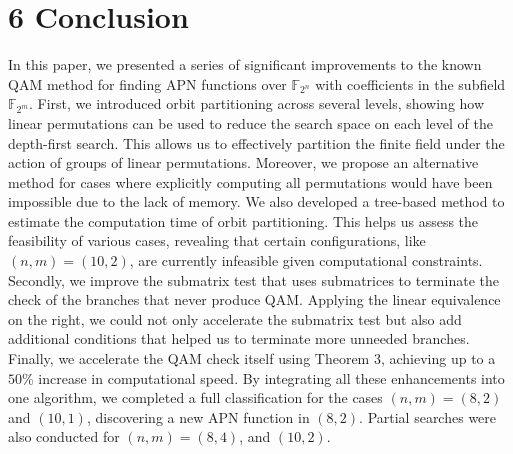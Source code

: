 \documentclass[10pt]{article}
\begin{document}
\section*{6 Conclusion}
In this paper, we presented a series of significant improvements to the known QAM method for finding APN functions over $\mathbb{F}_{2^{n}}$ with coefficients in the subfield $\mathbb{F}_{2^{m}}$. First, we introduced orbit partitioning across several levels, showing how linear permutations can be used to reduce the search space on each level of the depth-first search. This allows us to effectively partition the finite field under the action of groups of linear permutations. Moreover, we propose an alternative method for cases where explicitly computing all permutations would have been impossible due to the lack of memory. We also developed a tree-based method to estimate the computation time of orbit partitioning. This helps us assess the feasibility of various cases, revealing that certain configurations, like $(n, m)=(10,2)$, are currently infeasible given computational constraints. Secondly, we improve the submatrix test that uses submatrices to terminate the check of the branches that never produce QAM. Applying the linear equivalence on the right, we could not only accelerate the submatrix test but also add additional conditions that helped us to terminate more unneeded branches. Finally, we accelerate the QAM check itself using Theorem 3, achieving up to a $50 \%$ increase in computational speed. By integrating all these enhancements into one algorithm, we completed a full classification for the cases $(n, m)=(8,2)$ and $(10,1)$, discovering a new APN function in $(8,2)$. Partial searches were also conducted for $(n, m)=(8,4)$, and $(10,2)$.
\end{document}
